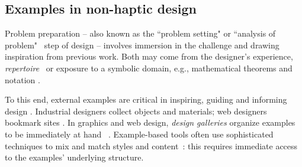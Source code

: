 


\subsection{Examples in non-haptic design}

Problem preparation -- also known as the ``problem setting" \cite{Schon1982} or ``analysis of problem"~\cite{Warr2005}
step of design -- involves 
immersion in the challenge
and drawing inspiration from previous work. %
Both may come from the designer's experience,  \emph{repertoire}~\cite{Schon1982} or exposure to a symbolic domain, e.g., mathematical theorems and notation %
\cite{Csikszentmihalyi1996}.

To this end, external examples are critical in inspiring, guiding and informing design \cite{Herring2009,Buxton2007}. 
Industrial designers collect objects %
and materials; web designers bookmark sites \cite{Herring2009}.
In graphics and web design, \emph{design galleries} organize examples to be  immediately at hand %
~\cite{Lee2010a,Marks1997}.
Example-based tools often use sophisticated techniques to mix and match styles and content~\cite{Kumar2011}: this requires immediate access to the examples' underlying structure.
%

